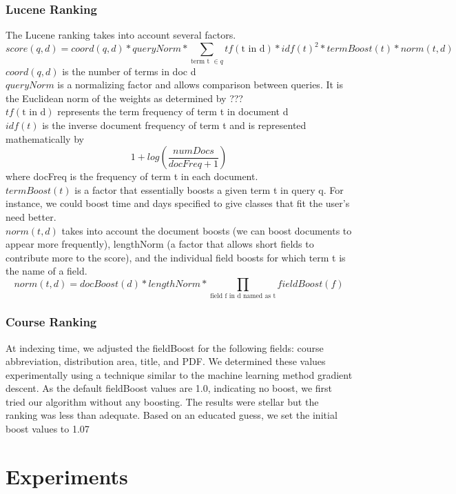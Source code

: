 \documentclass[12pt,letterpaper]{article}
\begin{document}
\subsubsection{Lucene Ranking}
The Lucene ranking takes into account several factors. 
\begin{equation}
  score(q,d) = coord(q,d) * queryNorm * \sum_{\text{term t } \in q}{tf(\text{t in d}) * idf(t)^2 * termBoost(t) * norm(t,d)}
  \label{eq:practical}
\end{equation}
$coord(q,d)$ is the number of terms in doc d\\
$queryNorm$ is a normalizing factor and allows comparison between queries. It is the Euclidean norm of the weights as determined by ???\\
$tf(\text{t in d})$ represents the term frequency of term t in document d \\
$idf(t)$ is the inverse document frequency of term t and is represented mathematically by \[ 1 + log(\frac{numDocs}{docFreq + 1}) \] where docFreq is the frequency of term t in each document. \\
$termBoost(t)$ is a factor that essentially boosts a given term t in query q. For instance, we could boost time and days specified to give classes that fit the user's need better.\\
$norm(t, d)$ takes into account the document boosts (we can boost documents to appear more frequently), lengthNorm (a factor that allows short fields to contribute more to the score), and the individual field boosts for which term t is the name of a field. 
\[ norm(t,d) = docBoost(d) * lengthNorm * \prod_{\text{field f in d named as t}}{fieldBoost(f)} \] 				

\subsubsection{Course Ranking}
At indexing time, we adjusted the fieldBoost for the following fields: course abbreviation, distribution area, title, and PDF. We determined these values experimentally using a technique similar to the machine learning method gradient descent. As the default fieldBoost values are 1.0, indicating no boost, we first tried our algorithm without any boosting. The results were stellar but the ranking was less than adequate. Based on an educated guess, we set the initial boost values to 1.07

\section{Experiments}
\end{document}
